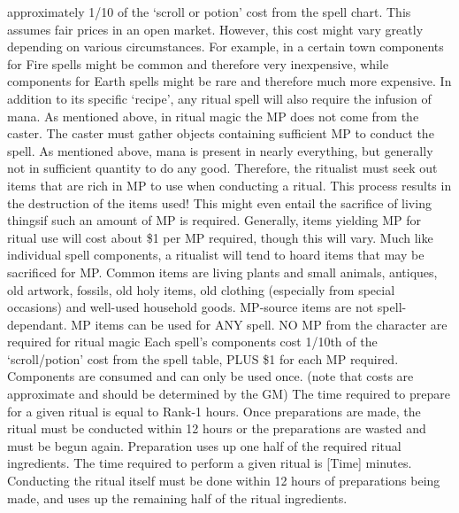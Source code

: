 \documentclass[twoside]{book}
\begin{document}
               approximately 1/10 of the `scroll or potion'
               cost from the spell chart. This assumes fair prices in an
               open market. However, this cost might vary greatly
               depending on various circumstances. For example, in a
               certain town components for Fire spells might be common
               and therefore very inexpensive, while components for Earth
               spells might be rare and therefore much more expensive.
                 In addition to its specific `recipe',
               any ritual spell will also require the infusion of mana.
               As mentioned above, in ritual magic the MP does not come
               from the caster. The caster must gather objects containing
               sufficient MP to conduct the spell. As mentioned above,
               mana is present in nearly everything, but generally not in
               sufficient quantity to do any good. Therefore, the
               ritualist must seek out items that are rich in MP to use
               when conducting a ritual. This process results in the
               destruction of the items used! This might even entail the
               sacrifice of living thingsif such an amount of MP
               is required. Generally, items yielding MP for ritual use
               will cost about \$1 per MP required, though this will vary.
               Much like individual spell components, a ritualist will
               tend to hoard items that may be sacrificed for MP. Common
               items are living plants and small animals, antiques, old
               artwork, fossils, old holy items, old clothing (especially
               from special occasions) and well-used household goods.
               MP-source items are not spell-dependant. MP items can be
               used for ANY spell.   
                  NO MP from the character are required for ritual
                 magic 
                  Each spell's components cost 1/10th of the
                 `scroll/potion' cost from the spell table,
                 PLUS \$1 for each MP required. Components are consumed
                 and can only be used once. (note that costs are
                 approximate and should be determined by the GM) 
                  The time required to prepare for a given ritual
                 is equal to Rank-1 hours. Once preparations are made,
                 the ritual must be conducted within 12 hours or the
                 preparations are wasted and must be begun again.
                 Preparation uses up one half of the required ritual
                 ingredients. 
                  The time required to perform a given ritual is
                 [Time] minutes. Conducting the ritual itself must be
                 done within 12 hours of preparations being made, and
                 uses up the remaining half of the ritual ingredients.
                 
\end{document}
